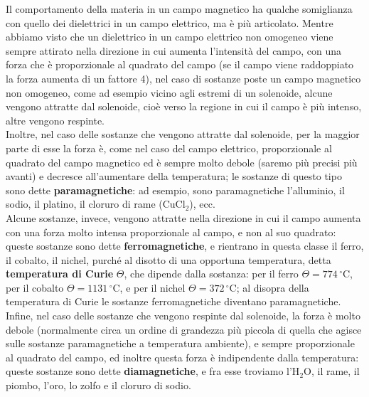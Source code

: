 Il comportamento della materia in un campo magnetico ha qualche somiglianza con
quello dei dielettrici in un campo elettrico, ma \`e pi\`u articolato. Mentre
abbiamo visto che un dielettrico in un campo elettrico non omogeneo viene sempre
attirato nella direzione in cui aumenta l'intensit\`a del campo, con una forza
che \`e proporzionale al quadrato del campo (se il campo viene raddoppiato la
forza aumenta di un fattore 4), nel caso di sostanze poste un campo magnetico
non omogeneo, come ad esempio vicino agli estremi di un solenoide, alcune
vengono attratte dal solenoide, cio\`e verso la regione in cui il campo \`e
pi\`u intenso, altre vengono respinte.\\
Inoltre, nel caso delle sostanze che vengono attratte dal solenoide, per la
maggior parte di esse la forza \`e, come nel caso del campo elettrico,
proporzionale al quadrato del campo magnetico ed \`e sempre molto debole (saremo
pi\`u precisi pi\`u avanti) e decresce all'aumentare della temperatura; le
sostanze di questo tipo sono dette \textbf{paramagnetiche}: ad esempio, sono
paramagnetiche l'alluminio, il sodio, il platino, il cloruro di rame (CuCl$_2$),
ecc.\\
Alcune sostanze, invece, vengono attratte nella direzione in cui il campo
aumenta con una forza molto intensa proporzionale al campo, e non al suo
quadrato: queste sostanze sono dette \textbf{ferromagnetiche}, e rientrano in
questa classe il ferro, il cobalto, il nichel, purch\'e al disotto di una
opportuna temperatura, detta \textbf{temperatura di Curie} $\Theta$, che dipende
dalla sostanza: per il ferro $\Theta=774\,^\circ$C, per il cobalto
$\Theta=1131\,^\circ$C, e per il nichel $\Theta=372\,^\circ$C; al disopra della
temperatura di Curie le sostanze ferromagnetiche diventano paramagnetiche.\\
Infine, nel caso delle sostanze che vengono respinte dal solenoide, la forza \`e
molto debole (normalmente circa un ordine di grandezza pi\`u piccola di quella
che agisce sulle sostanze paramagnetiche a temperatura ambiente), e sempre
proporzionale al quadrato del campo, ed inoltre questa forza \`e indipendente
dalla temperatura: queste sostanze sono dette \textbf{diamagnetiche}, e fra esse
troviamo l'H$_2$O, il rame, il piombo, l'oro, lo zolfo e il cloruro di sodio.

